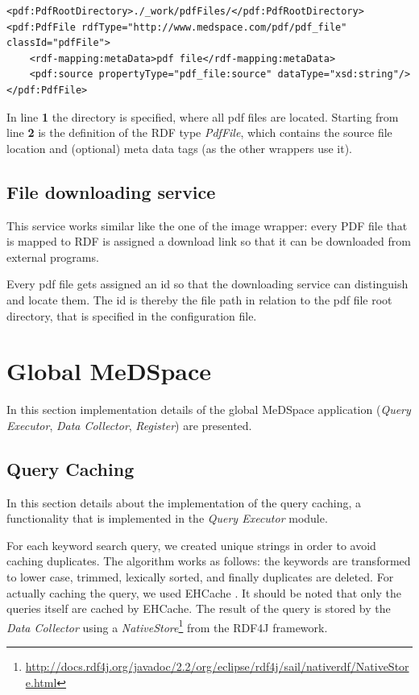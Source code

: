 \begin{lstlisting}[style=RdfCodeStyle, caption=Extract of the pdf wrapper configuration, label=PDFWrapperMappingConfig]
<pdf:PdfRootDirectory>./_work/pdfFiles/</pdf:PdfRootDirectory>
<pdf:PdfFile rdfType="http://www.medspace.com/pdf/pdf_file" classId="pdfFile">
	<rdf-mapping:metaData>pdf file</rdf-mapping:metaData>
    <pdf:source propertyType="pdf_file:source" dataType="xsd:string"/>
</pdf:PdfFile>
\end{lstlisting}

In line \textbf{1} the directory is specified, where all pdf files are located.
Starting from line \textbf{2} is the definition of the RDF type \emph{PdfFile}, which contains the source file location and (optional) meta data tags (as the other wrappers use it).

\subsection{File downloading service}

This service works similar like the one of the image wrapper: every PDF file that is mapped to RDF is assigned a download link so that it can be downloaded from external programs.

Every pdf file gets assigned an id so that the downloading service can distinguish and locate them. The id is thereby the file path in relation to the pdf file root directory, that is specified in the configuration file.

\section{Global MeDSpace}

In this section implementation details of the global MeDSpace application (\emph{Query Executor}, \emph{Data Collector}, \emph{Register}) are presented.


\subsection{Query Caching}
In this section details about the implementation of the query caching, a functionality that is implemented in the \emph{Query Executor} module.

For each keyword search query, we created unique strings in order to avoid caching duplicates.
The algorithm works as follows: the keywords are transformed to lower case, trimmed, lexically sorted, and finally duplicates are deleted.
For actually caching the query, we used EHCache \cite{EHCache}. 
It should be noted that only the queries itself are cached by EHCache. The result of the query is stored by the \emph{Data Collector} using a \emph{NativeStore}\footnote{\url{http://docs.rdf4j.org/javadoc/2.2/org/eclipse/rdf4j/sail/nativerdf/NativeStore.html}} from the RDF4J framework.

